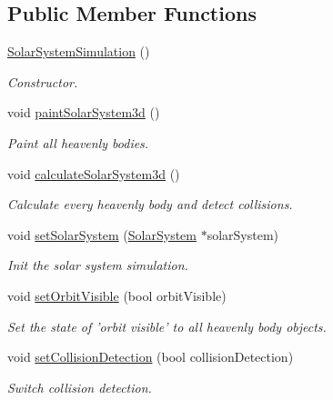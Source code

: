 \subsection*{\-Public \-Member \-Functions}
\begin{DoxyCompactItemize}
\item 
\hyperlink{classSolarSystemSimulation_a5f98b5e88607f9fb54343829aa7dcff8}{\-Solar\-System\-Simulation} ()
\begin{DoxyCompactList}\small\item\em \-Constructor. \end{DoxyCompactList}\item 
void \hyperlink{classSolarSystemSimulation_a6d3f9f594e299d57ba6d16ed10b96540}{paint\-Solar\-System3d} ()
\begin{DoxyCompactList}\small\item\em \-Paint all heavenly bodies. \end{DoxyCompactList}\item 
void \hyperlink{classSolarSystemSimulation_a957a5287d6df1eb3bc8d3eafec08b27a}{calculate\-Solar\-System3d} ()
\begin{DoxyCompactList}\small\item\em \-Calculate every heavenly body and detect collisions. \end{DoxyCompactList}\item 
void \hyperlink{classSolarSystemSimulation_a08f2e91e1d546289639b796c5abc0a25}{set\-Solar\-System} (\hyperlink{classSolarSystem}{\-Solar\-System} $\ast$solar\-System)
\begin{DoxyCompactList}\small\item\em \-Init the solar system simulation. \end{DoxyCompactList}\item 
void \hyperlink{classSolarSystemSimulation_a01a0daa6b8c504803ea79691642e0bc6}{set\-Orbit\-Visible} (bool orbit\-Visible)
\begin{DoxyCompactList}\small\item\em \-Set the state of 'orbit visible' to all heavenly body objects. \end{DoxyCompactList}\item 
void \hyperlink{classSolarSystemSimulation_a1e1e255704626eda098072a906606d9d}{set\-Collision\-Detection} (bool collision\-Detection)
\begin{DoxyCompactList}\small\item\em \-Switch collision detection. \end{DoxyCompactList}\item 

\end{DoxyCompactItemize}
